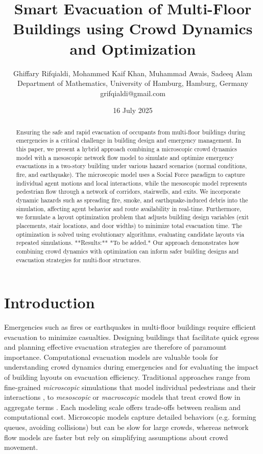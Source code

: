 \documentclass[11pt,a4paper]{article}
\title{Smart Evacuation of Multi-Floor Buildings using Crowd Dynamics and Optimization}
\author{Ghiffary Rifqialdi, Mohammed Kaif Khan, Muhammad Awais, Sadeeq Alam\\[1ex] \normalsize Department of Mathematics, University of Hamburg, Hamburg, Germany\\ \normalsize grifqialdi@gmail.com}
\date{16 July 2025}
\begin{document}
\maketitle

\begin{abstract}
Ensuring the safe and rapid evacuation of occupants from multi-floor buildings during emergencies is a critical challenge in building design and emergency management. In this paper, we present a hybrid approach combining a microscopic crowd dynamics model with a mesoscopic network flow model to simulate and optimize emergency evacuations in a two-story building under various hazard scenarios (normal conditions, fire, and earthquake). The microscopic model uses a Social Force paradigm to capture individual agent motions and local interactions, while the mesoscopic model represents pedestrian flow through a network of corridors, stairwells, and exits. We incorporate dynamic hazards such as spreading fire, smoke, and earthquake-induced debris into the simulation, affecting agent behavior and route availability in real-time. Furthermore, we formulate a layout optimization problem that adjusts building design variables (exit placements, stair locations, and door widths) to minimize total evacuation time. The optimization is solved using evolutionary algorithms, evaluating candidate layouts via repeated simulations. **Results:** *To be added.* Our approach demonstrates how combining crowd dynamics with optimization can inform safer building designs and evacuation strategies for multi-floor structures.
\end{abstract}

\section{Introduction}
Emergencies such as fires or earthquakes in multi-floor buildings require efficient evacuation to minimize casualties. Designing buildings that facilitate quick egress and planning effective evacuation strategies are therefore of paramount importance. Computational evacuation models are valuable tools for understanding crowd dynamics during emergencies and for evaluating the impact of building layouts on evacuation efficiency. Traditional approaches range from fine-grained \textit{microscopic} simulations that model individual pedestrians and their interactions \cite{helbing1995}, to \textit{mesoscopic} or \textit{macroscopic} models that treat crowd flow in aggregate terms \cite{Kuligowski2010}. Each modeling scale offers trade-offs between realism and computational cost. Microscopic models capture detailed behaviors (e.g. forming queues, avoiding collisions) but can be slow for large crowds, whereas network flow models are faster but rely on simplifying assumptions about crowd movement.
\end{document}
